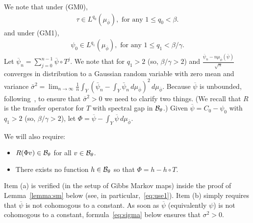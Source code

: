 \documentclass[12pt]{article}
\numberwithin{equation}{section}
\begin{document}
We note that under (GM0), 
\begin{align}\label{tauq}
 \tau\in L^{q_0}(\mu_{\overline{\phi}}),\text{ for any } 1\le q_0<\beta.
\end{align}
and under (GM1),
\begin{align}\label{psi0q}
 \psi_0\in L^{q_1}(\mu_{\overline{\phi}}),\text{ for any } 1\le q_1<\beta/\gamma.
\end{align}
Let $\overline\psi_n=\sum_{j=0}^{n-1}\overline\psi\circ T^j$.
We note that for $q_1>2$ (so, $\beta/\gamma>2$) and 
$\frac{\overline\psi_n-n\mu_{\overline{\phi}}(\bar\psi)}{\sqrt n}$ converges in distribution to a Gaussian random variable with
zero mean and variance $\bar\sigma^2=\lim_{n\to\infty}\frac{1}{n}\int_Y \left(\bar\psi_n-\int_Y \bar\psi_n\,d\mu_{\overline{\phi}}\right)^2\,d\mu_{\overline{\phi}}$.
Because $\overline\psi$ is unbounded, following~\cite[Theorem 3.7]{Gou04},  to ensure that $\bar\sigma^2> 0$ we need to clarify two things. (We recall that $R$ is the transfer operator for $T$
with spectral gap in $\mathcal{B}_\theta$.) Given  $\overline\psi=C_0-\psi_0$ with $q_1>2$ (so, $\beta/\gamma>2$), let 
 $\Phi=\overline\psi-\int_Y \overline\psi\, d\mu_{\overline{\phi}}$.

We will also require:
 \begin{itemize}
 \item[(a)]$R(\Phi v)\in\mathcal{B}_\theta$ for all $v\in\mathcal{B}_\theta$.
 \item[(b)] There exists no function $h\in\mathcal{B}_\theta$ so that $\Phi=h-h\circ T$.
 \end{itemize}


\begin{rmk}\label{rmk:use1111}
 Item (a) is verified (in the setup of Gibbs Markov maps) inside the proof of Lemma~\ref{lemma:sm} below (see, in particular,~\eqref{eq:use1}). Item (b) simply requires that $\overline\psi$ is not cohomogous to a constant.
 As soon as $\overline\psi$ (equivalently $\psi$) is not cohomogous to a constant, formula~\eqref{eq:sigma} below ensures that $\sigma^2>0$.
\end{rmk}
\end{document}

